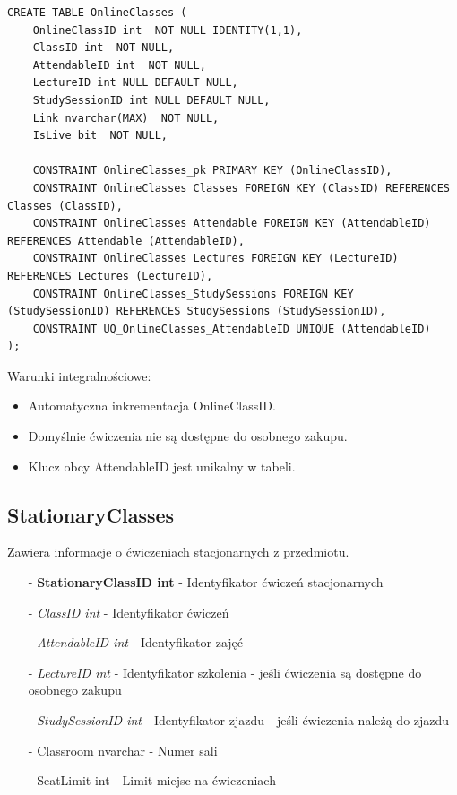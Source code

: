 \documentclass[11pt,a4paper]{article}
\begin{document}
\begin{Verbatim}[breaklines=true]
CREATE TABLE OnlineClasses (
    OnlineClassID int  NOT NULL IDENTITY(1,1),
    ClassID int  NOT NULL,
    AttendableID int  NOT NULL,
    LectureID int NULL DEFAULT NULL,
    StudySessionID int NULL DEFAULT NULL,
    Link nvarchar(MAX)  NOT NULL,
    IsLive bit  NOT NULL,

    CONSTRAINT OnlineClasses_pk PRIMARY KEY (OnlineClassID),
    CONSTRAINT OnlineClasses_Classes FOREIGN KEY (ClassID) REFERENCES Classes (ClassID),
    CONSTRAINT OnlineClasses_Attendable FOREIGN KEY (AttendableID) REFERENCES Attendable (AttendableID),
    CONSTRAINT OnlineClasses_Lectures FOREIGN KEY (LectureID) REFERENCES Lectures (LectureID),
    CONSTRAINT OnlineClasses_StudySessions FOREIGN KEY (StudySessionID) REFERENCES StudySessions (StudySessionID),
    CONSTRAINT UQ_OnlineClasses_AttendableID UNIQUE (AttendableID)
);
\end{Verbatim}

Warunki integralnościowe:
\begin{itemize}
    \item Automatyczna inkrementacja OnlineClassID.
    \item Domyślnie ćwiczenia nie są dostępne do osobnego zakupu.
    \item Klucz obcy AttendableID jest unikalny w tabeli.
\end{itemize}

\subsection{StationaryClasses}
Zawiera informacje o ćwiczeniach stacjonarnych z przedmiotu.

\begin{itemize}
    \item[-] \textbf{StationaryClassID int} - Identyfikator ćwiczeń stacjonarnych
    \item[-] \textit{ClassID int} - Identyfikator ćwiczeń
    \item[-] \textit{AttendableID int} - Identyfikator zajęć
    \item[-] \textit{LectureID int} - Identyfikator szkolenia - jeśli ćwiczenia są dostępne do osobnego zakupu
    \item[-] \textit{StudySessionID int} - Identyfikator zjazdu - jeśli ćwiczenia należą do zjazdu
    \item[-] Classroom nvarchar - Numer sali
    \item[-] SeatLimit int - Limit miejsc na ćwiczeniach
\end{itemize}
\end{document}
